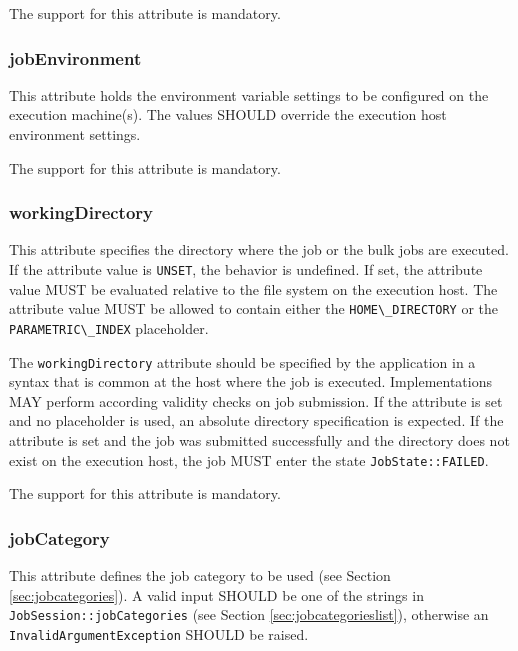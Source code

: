 \documentclass{article}
\newcommand{\h}[1]{\lstinline|#1|}
\newcommand{\rat}[1]{}
\begin{document}
The support for this attribute is mandatory.

\rat{
The differentiation between re-runnable and checkpointable was decided on a conf call (Aug 25th 2010). Checkpointability indication was intentionally left out, since there is no common understanding in the DRM systems (conf call Apr. 27th, 2011).
}

\subsubsection{jobEnvironment}

This attribute holds the environment variable settings to be configured on the execution machine(s). The values SHOULD override the execution host environment settings. 

The support for this attribute is mandatory.

\subsubsection{workingDirectory}

This attribute specifies the directory where the job or the bulk jobs are executed. If the attribute value is \h{UNSET}, the behavior is undefined. If set, the attribute value MUST be evaluated relative to the file system on the execution host. The attribute value MUST be allowed to contain either the \h{HOME\_DIRECTORY} or the \h{PARAMETRIC\_INDEX} placeholder.

The \h{workingDirectory} attribute should be specified by the application in a syntax that is common at the host where the job is executed. Implementations MAY perform according validity checks on job submission. If the attribute is set and no placeholder is used, an absolute directory specification is expected. If the attribute is set and the job was submitted successfully and the directory does not exist on the execution host, the job MUST enter the state \h{JobState::FAILED}.

The support for this attribute is mandatory.

\subsubsection{jobCategory}

This attribute defines the job category to be used (see Section \ref{sec:jobcategories}). A valid input SHOULD be one of the strings in \h{JobSession::jobCategories} (see Section \ref{sec:jobcategorieslist}), otherwise an \h{InvalidArgumentException} SHOULD be raised.
\end{document}
